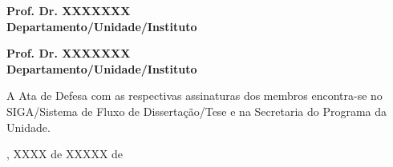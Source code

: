 {\begin{folhadeaprovacao}
\begin{center}
\begin{flushleft}
				\vspace{0.6cm}
				{\bfseries Prof. Dr. XXXXXXX\\
				Departamento/Unidade/Instituto\\}
				
				\vspace{0.6cm}
				{\bfseries Prof. Dr. XXXXXXX\\
				Departamento/Unidade/Instituto\\}

				\vspace{1.0cm}

				A Ata de Defesa com as respectivas assinaturas dos membros encontra-se no
				SIGA/Sistema de Fluxo de Dissertação/Tese e
				na Secretaria do Programa da Unidade.

			\end{flushleft}

			\begin{flushright}

				\vspace{0.8cm}
				\imprimircidade, XXXX de XXXXX de
				\imprimirano  %
			\end{flushright}
		\end{center}
	\end{folhadeaprovacao}
}

